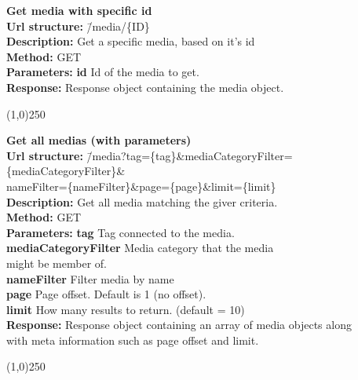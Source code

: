 \documentclass[11pt]{article}
\begin{document}
\begin{tabbing}
\textbf{Get media with specific id} \\
\textcolor{black!60}{\textbf{Url structure:}} \hspace{0.2in} \= /media/\{ID\} \\
\textcolor{black!60}{\textbf{Description:}}  \> Get a specific media, based on it's id \\
\textcolor{black!60}{\textbf{Method:}} \> GET \\
\textcolor{black!60}{\textbf{Parameters:}} \> \textbf{id} Id of the media to get. \\
\textcolor{black!60}{\textbf{Response:}} \> Response object containing the media object.
\end{tabbing}

\begin{center}\line(1,0){250}\end{center}

\begin{tabbing}
\textbf{Get all medias (with parameters)} \\
\textcolor{black!60}{\textbf{Url structure:}} \hspace{0.2in} \= /media?tag=\{tag\}\&mediaCategoryFilter=\{mediaCategoryFilter\}\& \\
\> nameFilter=\{nameFilter\}\&page=\{page\}\&limit=\{limit\} \\
\textcolor{black!60}{\textbf{Description:}}  \> Get all media matching the giver criteria. \\
\textcolor{black!60}{\textbf{Method:}} \> GET \\
\textcolor{black!60}{\textbf{Parameters:}} \> \textbf{tag} Tag connected to the media. \\
\> \textbf{mediaCategoryFilter} Media category that the media \\
\> might be member of. \\
\> \textbf{nameFilter} Filter media by name \\
\> \textbf{page} Page offset. Default is 1 (no offset). \\
\> \textbf{limit} How many results to return. (default = 10) \\
\textcolor{black!60}{\textbf{Response:}} \> Response object containing an array of media objects along \\
\> with meta information such as page offset and limit.
\end{tabbing}

\begin{center}\line(1,0){250}\end{center}
\end{document}
